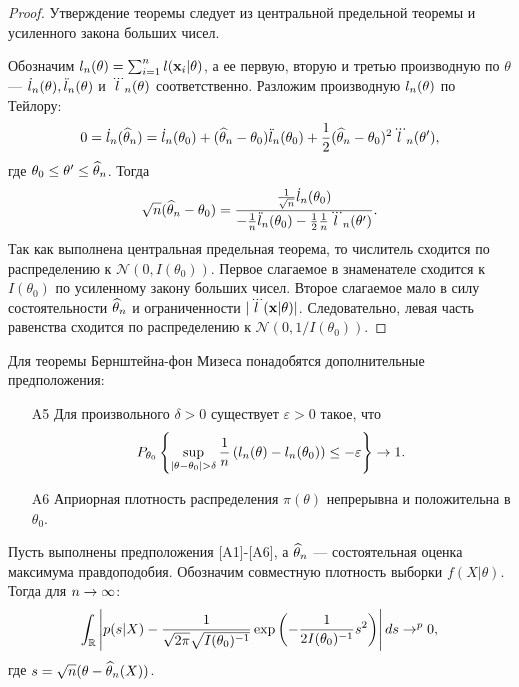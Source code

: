 \begin{proof}
Утверждение теоремы следует из центральной предельной теоремы и усиленного закона больших чисел. 

Обозначим $l_n(\theta) = \sum_{i = 1}^{n} l(\mathbf{x}_i | \theta)$,
а ее первую, вторую и третью производную по $\theta$ --- $\dot{l}_n(\theta), \ddot{l}_n(\theta)$ и $\dddot{l}_n(\theta)$ соответственно.
Разложим производную $l_n(\theta)$ по Тейлору:
\[
0 = \dot{l}_{n}(\widehat{\theta}_n) = \dot{l}_{n}(\theta_0) + (\widehat{\theta}_n - \theta_0) \ddot{l}_{n}(\theta_0) + \frac12 (\widehat{\theta}_n - \theta_0)^2 \dddot{l}_{n}(\theta'),
\]
где $\theta_0 \leq \theta' \leq \widehat{\theta}_n$.
Тогда
\[
\sqrt{n} (\widehat{\theta}_n - \theta_0) = \frac{\frac{1}{\sqrt{n}} \dot{l}_{n}(\theta_0)}{-\frac{1}{n} \ddot{l}_{n}(\theta_0) - \frac12 \frac{1}{n} \dddot{l}_{n}(\theta')}. 
\]
Так как выполнена центральная предельная теорема, то числитель сходится по распределению к $\mathcal{N}(0, I(\theta_0))$.
Первое слагаемое в знаменателе сходится к $I(\theta_0)$ по усиленному закону больших чисел.
Второе слагаемое мало в силу состоятельности $\widehat{\theta}_n$ и ограниченности $|\dddot{l}(\mathbf{x} | \theta)|$.
Следовательно, левая часть равенства сходится по распределению к 
$\mathcal{N}(0, 1 / I(\theta_0))$.
\end{proof}

Для теоремы Бернштейна-фон Мизеса понадобятся дополнительные предположения:
\begin{itemize}
	\item[A5] Для произвольного $\delta > 0$ существует $\varepsilon > 0$ такое, что
	\[
	P_{\theta_0} \left\{ \sup_{|\theta - \theta_0| > \delta} \frac{1}{n} \left( l_n(\theta) - l_n(\theta_0) \right) \leq -\varepsilon \right\} \rightarrow 1.
	\]
	\item[A6] Априорная плотность распределения $\pi(\theta)$ непрерывна и положительна в $\theta_0$.
\end{itemize}

\begin{Theorem}
Пусть выполнены предположения [A1]-[A6], а $\widehat{\theta}_n$ --- состоятельная оценка максимума правдоподобия.
Обозначим совместную плотность выборки $f(X| \theta)$.
Тогда для $n \rightarrow \infty$:
\[
\int_{\mathbb{R}} \left|p(s | X) - \frac{1}{\sqrt{2\pi}\sqrt{I(\theta_0)^{-1}}} \exp \left(-\frac{1}{2 I(\theta_0)^{-1}} s^2 \right) \right| ds \rightarrow^{p} 0,
\]
где $s = \sqrt{n} (\theta - \widehat{\theta}_n(X))$.
\end{Theorem}

